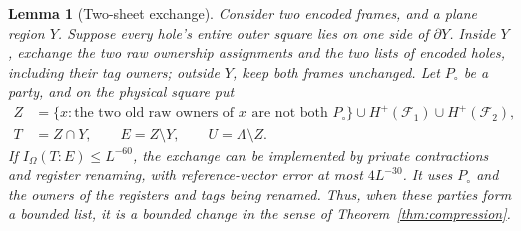 \documentclass[11pt]{article}
\numberwithin{equation}{section}
\newtheorem{lemma}[theorem]{Lemma}
\theoremstyle{definition}
\theoremstyle{remark}
\begin{document}
\begin{lemma}[Two-sheet exchange]\label{lem:exchange}
Consider two encoded frames, and a plane region $Y$.  Suppose every hole's
entire outer square lies on one side of $\partial Y$.  Inside $Y$, exchange
the two raw ownership assignments and the two lists of encoded holes,
including their tag owners; outside $Y$, keep both frames unchanged.
Let $P_\circ$ be a party, and on the physical square put
\begin{align}
 Z&=\{x:\text{the two old raw owners of }x
                         \text{ are not both }P_\circ\}
                  \cup H^+(\mathcal F_1)\cup H^+(\mathcal F_2),
                 \label{eq:exchange-Z}\\
 T&=Z\cap Y,\qquad E=Z\setminus Y,\qquad
 U=\Lambda\setminus Z.\label{eq:exchange-partition}
\end{align}
If $I_\Omega(T:E)\le L^{-60}$, the exchange can be implemented by private
contractions and register renaming, with reference-vector error at most
$4L^{-30}$.  It uses $P_\circ$ and the owners of the registers and tags
being renamed.  Thus, when these parties form a bounded list, it is a
bounded change in the sense of Theorem~\ref{thm:compression}.
\end{lemma}
\end{document}
